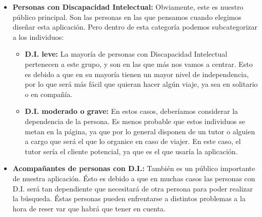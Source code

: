 \begin{itemize}
    \item \textbf{Personas con Discapacidad Intelectual:} Obviamente, este es nuestro público principal. Son las personas en las que pensamos cuando
            elegimos diseñar esta aplicación. Pero dentro de esta categoría podemos subcategorizar a los individuos:
            \begin{itemize}
                \item \textbf{D.I. leve:} La mayoría de personas con Discapacidad Intelectual pertenecen a este grupo, y son en las que más nos vamos a centrar.
                        Esto es debido a que en su mayoría tienen un mayor nivel de independencia, por lo que será más fácil que quieran hacer algún viaje, ya
                        sea en solitario o en compañía.
                \item \textbf{D.I. moderado o grave:} En estos casos, deberíamos considerar la dependencia de la persona. Es menos probable que estos individuos
                        se metan en la página, ya que por lo general disponen de un tutor o alguien a cargo que será el que lo organice en caso de viajer. En
                        este caso, el tutor sería el cliente potencial, ya que es el que usaría la aplicación. 
            \end{itemize}
    \item \textbf{Acompañantes de personas con D.I.:} También es un público importante de nuestra aplicación. Ésto es debido a que en muchas casos las personas con
            D.I. será tan dependiente que necesitará de otra persona para poder realizar la búsqueda. Éstas personas pueden enfrentarse a distintos problemas
            a la hora de reser var que habrá que tener en cuenta.
\end{itemize}




